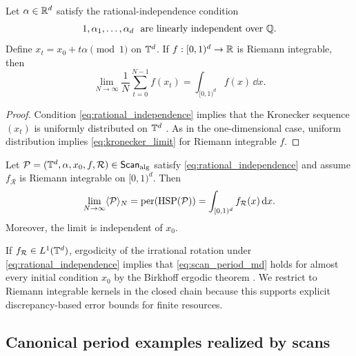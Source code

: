 \begin{theorem}
\label{thm:kronecker_md}
Let $\alpha\in\mathbb{R}^d$ satisfy the rational-independence condition
\begin{equation}
\label{eq:rational_independence}
1,\alpha_1,\dots,\alpha_d\ \ \text{are linearly independent over }\mathbb{Q}.
\end{equation}
Define $x_t=x_0+t\alpha\pmod{1}$ on $\mathbb{T}^d$. If $f:[0,1)^d\to\mathbb{R}$ is Riemann integrable, then
\begin{equation}
\label{eq:kronecker_limit}
\lim_{N\to\infty}\frac{1}{N}\sum_{t=0}^{N-1} f(x_t)
=\int_{[0,1)^d} f(x)\,\dd x.
\end{equation}
\end{theorem}

\begin{proof}
Condition \eqref{eq:rational_independence} implies that the Kronecker sequence $(x_t)$ is uniformly distributed on $\mathbb{T}^d$ \cite{KuipersNiederreiter1974}. As in the one-dimensional case, uniform distribution implies \eqref{eq:kronecker_limit} for Riemann integrable $f$.
\end{proof}

\begin{corollary}
\label{cor:scan_period_md}
Let $\mathcal{P}=(\mathbb{T}^d,\alpha,x_0,f,\mathcal{R})\in\mathsf{Scan}_{\mathrm{alg}}$ satisfy \eqref{eq:rational_independence} and assume $f_{\mathcal{R}}$ is Riemann integrable on $[0,1)^d$. Then
\begin{equation}
\label{eq:scan_period_md}
\lim_{N\to\infty}\langle \mathcal{P} \rangle_N
=\mathrm{per}(\mathrm{HSP}(\mathcal{P}))
=\int_{[0,1)^d} f_{\mathcal{R}}(x)\,\mathrm{d} x.
\end{equation}
Moreover, the limit is independent of $x_0$.
\end{corollary}

\begin{remark}
\label{rem:birkhoff_extension}
If $f_{\mathcal{R}}\in L^1(\mathbb{T}^d)$, ergodicity of the irrational rotation under \eqref{eq:rational_independence} implies that \eqref{eq:scan_period_md} holds for almost every initial condition $x_0$ by the Birkhoff ergodic theorem \cite{KatokHasselblatt1995}. We restrict to Riemann integrable kernels in the closed chain because this supports explicit discrepancy-based error bounds for finite resources.
\end{remark}

\subsection{Canonical period examples realized by scans}
\label{sec:canonical_period_examples}

